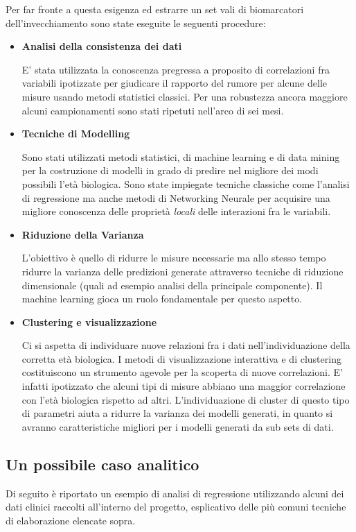 \documentclass[12pt,openright,twoside,a4paper]{book}
\begin{document}
Per far fronte a questa esigenza ed estrarre un set vali di biomarcatori dell'invecchiamento sono state eseguite le seguenti procedure:
\pagebreak
\begin{itemize}
\item \textbf{Analisi della consistenza dei dati}

E' stata utilizzata la conoscenza pregressa a proposito di correlazioni fra variabili ipotizzate per giudicare il rapporto del rumore per alcune delle misure usando metodi statistici classici.
Per una robustezza ancora maggiore alcuni campionamenti sono stati ripetuti nell'arco di sei mesi.
\item \textbf{Tecniche di Modelling}

Sono stati utilizzati metodi statistici, di machine learning e di data mining per la costruzione di modelli in grado di predire nel migliore dei modi possibili l'età biologica.
Sono state impiegate tecniche classiche come  l'analisi di regressione ma anche metodi di Networking Neurale per acquisire una migliore conoscenza delle proprietà \textit{locali} delle interazioni fra le variabili.

\item \textbf{Riduzione della Varianza}

L'obiettivo è quello di ridurre le misure necessarie ma allo stesso tempo ridurre la varianza delle predizioni generate attraverso tecniche di riduzione dimensionale (quali ad esempio analisi della principale componente).
Il machine learning gioca un ruolo fondamentale per questo aspetto.

\item \textbf{Clustering e visualizzazione}

Ci si aspetta di individuare nuove relazioni fra i dati nell'individuazione della corretta età biologica.
I metodi di visualizzazione interattiva e di clustering costituiscono un strumento agevole per la scoperta di nuove correlazioni.
E' infatti ipotizzato che alcuni tipi di misure abbiano una maggior correlazione con l'età biologica rispetto ad altri.
L'individuazione di cluster di questo tipo di parametri aiuta a ridurre la varianza dei modelli generati, in quanto si avranno caratteristiche migliori per i modelli generati da sub sets di dati.

\end{itemize}
\pagebreak

\subsection{Un possibile caso analitico}
Di seguito è riportato un esempio di analisi di regressione utilizzando alcuni dei dati clinici raccolti all'interno del progetto, esplicativo delle più comuni tecniche di elaborazione elencate sopra.
\end{document}
